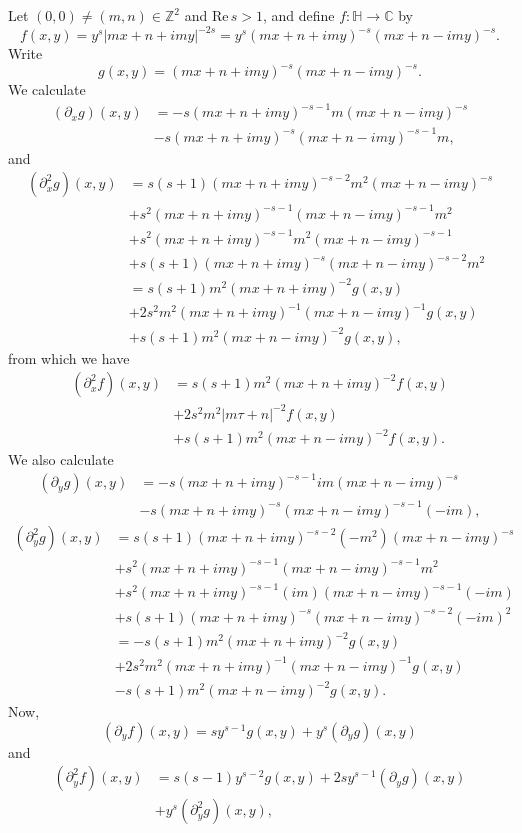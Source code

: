 \documentclass{article}
\def\Re{\ensuremath{\mathrm{Re}}\,}
\theoremstyle{definition}
\begin{document}
Let $(0,0) \neq (m,n) \in \mathbb{Z}^2$ and $\Re s>1$, and define $f:\mathbb{H} \to \mathbb{C}$ by
\[
f(x,y) = y^s |mx+n+imy|^{-2s} = 
y^s (mx+n+imy)^{-s}(mx+n-imy)^{-s}.
\]
Write
\[
g(x,y) = (mx+n+imy)^{-s}(mx+n-imy)^{-s}.
\]
We calculate
\begin{align*}
(\partial_x g)(x,y)&=
-s(mx+n+imy)^{-s-1}m(mx+n-imy)^{-s}\\
&-s(mx+n+imy)^{-s}(mx+n-imy)^{-s-1}m,
\end{align*}
and
\begin{align*}
(\partial_x^2 g)(x,y)&=s(s+1)(mx+n+imy)^{-s-2}m^2(mx+n-imy)^{-s}\\
&+s^2(mx+n+imy)^{-s-1} (mx+n-imy)^{-s-1}m^2\\
&+s^2(mx+n+imy)^{-s-1} m^2 (mx+n-imy)^{-s-1}\\
&+s(s+1)(mx+n+imy)^{-s}(mx+n-imy)^{-s-2}m^2\\
&=s(s+1)m^2 (mx+n+imy)^{-2} g(x,y)\\
&+2s^2m^2(mx+n+imy)^{-1}(mx+n-imy)^{-1} g(x,y)\\
&+s(s+1)m^2 (mx+n-imy)^{-2} g(x,y),
\end{align*}
from which we have
\begin{align*}
(\partial_x^2 f)(x,y)&=s(s+1)m^2(mx+n+imy)^{-2} f(x,y)\\
&+2s^2m^2|m\tau+n|^{-2} f(x,y)\\
&+s(s+1)m^2(mx+n-imy)^{-2} f(x,y).
\end{align*}
We also calculate
\begin{align*}
(\partial_y g)(x,y)&=-s(mx+n+imy)^{-s-1} im (mx+n-imy)^{-s}\\
&-s(mx+n+imy)^{-s} (mx+n-imy)^{-s-1} (-im),
\end{align*}
\begin{align*}
(\partial_y^2 g)(x,y)&=s(s+1)(mx+n+imy)^{-s-2} (-m^2)(mx+n-imy)^{-s}\\
&+s^2(mx+n+imy)^{-s-1}(mx+n-imy)^{-s-1} m^2\\
&+s^2(mx+n+imy)^{-s-1}(im)(mx+n-imy)^{-s-1}(-im)\\
&+s(s+1)(mx+n+imy)^{-s}(mx+n-imy)^{-s-2}(-im)^2\\
&=-s(s+1)m^2(mx+n+imy)^{-2}g(x,y)\\
&+2s^2m^2(mx+n+imy)^{-1}(mx+n-imy)^{-1} g(x,y)\\
&-s(s+1)m^2(mx+n-imy)^{-2} g(x,y).
\end{align*}
Now,
\[
(\partial_y f)(x,y) = sy^{s-1} g(x,y)+y^s (\partial_y g)(x,y)
\]
and
\begin{align*}
(\partial_y^2 f)(x,y)&=s(s-1) y^{s-2} g(x,y)+2sy^{s-1} (\partial_y g)(x,y)\\
&+ y^s (\partial_y^2 g)(x,y),
\end{align*}
\end{document}

